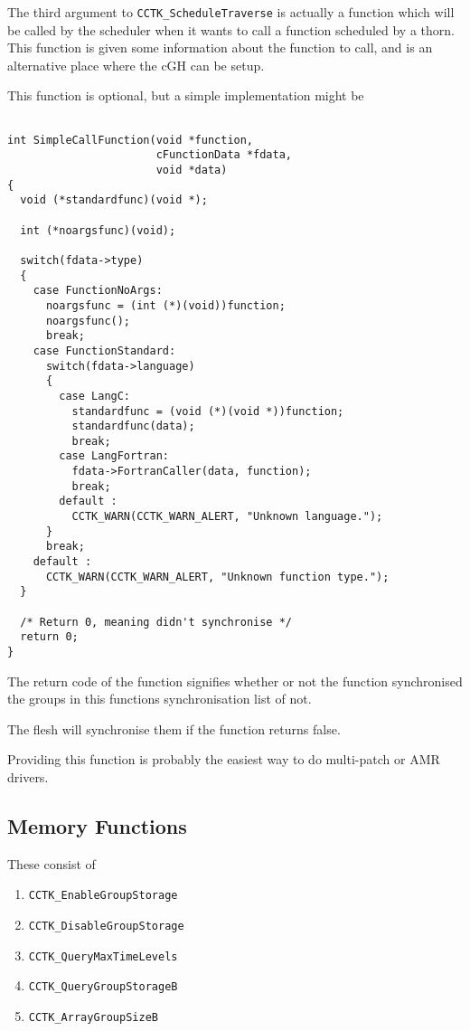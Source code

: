 The third argument to {\tt CCTK\_ScheduleTraverse} is actually a function
which will be called by the scheduler when it wants to call a function
scheduled by a thorn.  This function is given some information about
the function to call, and is an alternative place where the cGH can be setup.

This function is optional, but a simple implementation might be

\begin{verbatim}

int SimpleCallFunction(void *function,
                       cFunctionData *fdata,
                       void *data)
{
  void (*standardfunc)(void *);

  int (*noargsfunc)(void);

  switch(fdata->type)
  {
    case FunctionNoArgs:
      noargsfunc = (int (*)(void))function;
      noargsfunc();
      break;
    case FunctionStandard:
      switch(fdata->language)
      {
        case LangC:
          standardfunc = (void (*)(void *))function;
          standardfunc(data);
          break;
        case LangFortran:
          fdata->FortranCaller(data, function);
          break;
        default :
          CCTK_WARN(CCTK_WARN_ALERT, "Unknown language.");
      }
      break;
    default :
      CCTK_WARN(CCTK_WARN_ALERT, "Unknown function type.");
  }

  /* Return 0, meaning didn't synchronise */
  return 0;
}

\end{verbatim}

The return code of the function signifies whether or not the function
synchronised the groups in this functions synchronisation list of not.

The flesh will synchronise them if the function returns false.

Providing this function is probably the easiest way to do multi-patch or
AMR drivers.

\subsection{Memory Functions}

These consist of
\begin{enumerate}
\item{} {\tt CCTK\_EnableGroupStorage}
\item{} {\tt CCTK\_DisableGroupStorage}
\item{} {\tt CCTK\_QueryMaxTimeLevels}
\item{} {\tt CCTK\_QueryGroupStorageB}
\item{} {\tt CCTK\_ArrayGroupSizeB}
\end{enumerate}

